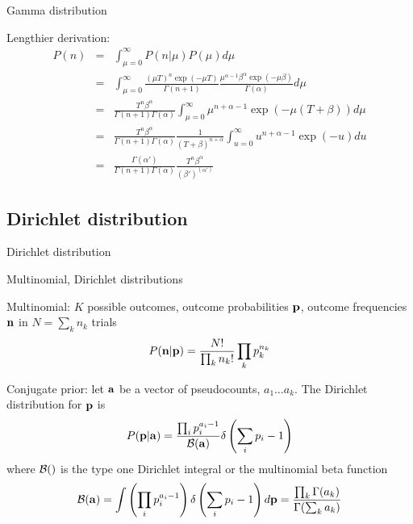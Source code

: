 \documentclass{beamer}
\begin{document}
\begin{frame}{Gamma distribution}

\itemb
 \item Lengthier derivation:
\begin{eqnarray*}
P(n) & = & \int_{\mu=0}^\infty P(n|\mu) P(\mu) d\mu \\
& = & \int_{\mu=0}^\infty \frac{(\mu T)^n \exp(-\mu T)}{\Gamma(n+1)} \frac{\mu^{\alpha-1} \beta^\alpha \exp(-\mu \beta)}{\Gamma(\alpha)} d\mu \\
& = & \frac{T^n \beta^\alpha}{\Gamma(n+1)\Gamma(\alpha)} \int_{\mu=0}^\infty \mu^{n+\alpha-1} \exp(-\mu (T+\beta)) d\mu \\
& = & \frac{T^n \beta^\alpha}{\Gamma(n+1)\Gamma(\alpha)} \frac{1}{(T+\beta)^{n+\alpha}} \int_{u=0}^\infty u^{n+\alpha-1} \exp(-u) du \\
& = & \frac{\Gamma(\alpha')}{\Gamma(n+1)\Gamma(\alpha)} \frac{T^n \beta^\alpha}{(\beta')^{(\alpha')}}
\end{eqnarray*}
\iteme

\end{frame}

\subsection{Dirichlet distribution}

\begin{frame}{Dirichlet distribution}

\itemb
\item Multinomial, Dirichlet distributions
 \itemb
 \item Multinomial: $K$ possible outcomes, outcome probabilities ${\bf p}$, outcome frequencies ${\bf n}$ in $N=\sum_k n_k$ trials
\[
P({\bf n}|{\bf p}) = \frac{N!}{\prod_k n_k!} \prod_k p_k^{n_k}
\]
\item Conjugate prior: let ${\bf a}$ be a vector of \alert{pseudocounts}, $a_1 \ldots a_k$. The \alert{Dirichlet distribution} for ${\bf p}$ is
\[
P({\bf p}|{\bf a}) = \frac{\prod_i p_i^{a_i-1}}{{\cal B}({\bf a})} \delta \left( \sum_i p_i - 1 \right)
\]
where ${\cal B}()$ is the \alert{type one Dirichlet integral} or the \alert{multinomial beta function}
\[
{\cal B}({\bf a})
= \int \left( \prod_i p_i^{a_i-1} \right) \delta \left( \sum_i p_i - 1 \right) d{\bf p}
= \frac{\prod_k \Gamma(a_k)}{\Gamma(\sum_k a_k)}
\]
\iteme
\iteme

\end{frame}
\end{document}
